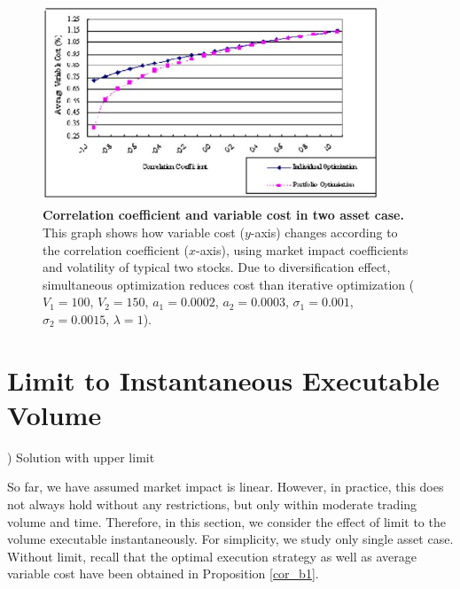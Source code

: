 \begin{figure}[htbp]
\begin{center}
  \includegraphics[width=10cm,height=6cm]{fg_b1n.png}
\end{center}
\caption[Correlation coefficient and variable cost in two asset case]{{\bf Correlation coefficient and variable cost in two asset case.}
 \quad This graph shows how variable cost ($y$-axis) changes according to the correlation coefficient
($x$-axis), using market impact coefficients and volatility of typical two stocks.
 Due to diversification effect, simultaneous optimization reduces cost than iterative optimization
($V_1=100$, $V_2=150$, $a_1=0.0002$, $a_2=0.0003$, $\sigma_1=0.001$, $\sigma_2=0.0015$,
$\lambda=1$).}\label{fg_b1}
\end{figure}

\section{Limit to Instantaneous Executable Volume}\label{sec_b4}

) Solution with upper limit 

 So far, we have assumed market impact is linear.  However, in practice, this does not always hold without any restrictions, but only within moderate trading volume and time.  Therefore, in this section, we consider the effect of limit to the volume executable instantaneously.  For simplicity, we study only single asset case.  Without limit, recall that the optimal execution strategy as well as average variable cost have been obtained in Proposition \ref{cor_b1}.

